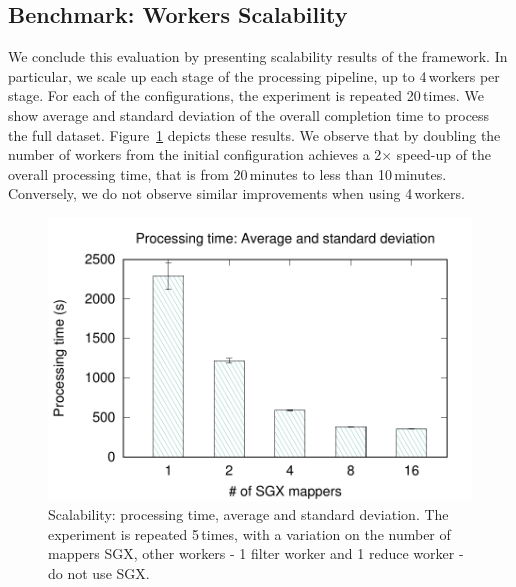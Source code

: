 

\subsection{Benchmark: Workers Scalability}
We conclude this evaluation by presenting scalability results of the \SYS{} framework.
In particular, we scale up each stage of the processing pipeline, up to 4\,workers per stage.
For each of the configurations, the experiment is repeated 20\,times.
We show average and standard deviation of the overall completion time to process the full dataset.
Figure~\ref{fig:scalability} depicts these results.
We observe that by doubling the number of workers from the initial configuration achieves a 2$\times$ speed-up of the overall processing time, that is from 20\,minutes to less than 10\,minutes.
Conversely, we do not observe similar improvements when using 4\,workers.

\begin{figure}[t!]
  \centering
  \includegraphics[width=\linewidth]{plots/secure_streams/scalability/sgxmapper_scalability}
  \caption{Scalability: processing time, average and standard deviation. The experiment is repeated 5\,times, with a variation on the number of mappers SGX, other workers - 1 filter worker and 1 reduce worker - do not use SGX.}
  \label{fig:scalability}
\end{figure}

